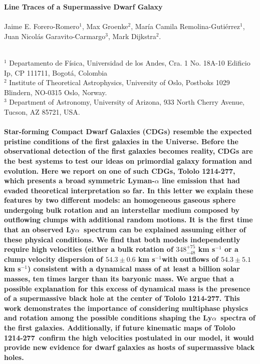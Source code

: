 \documentclass[a4paper, usenatbib, 12pt]{article}
\newcommand{\tol}{Tololo 1214-277}
\newcommand{\lya}{Ly$\alpha$}
\newcommand{\sigmaclump}{$54.3\pm 0.6$ km s$^{-1}$}
\newcommand{\inftyclump}{$54.3\pm 5.1$ km s$^{-1}$}
\begin{document}
\pagestyle{empty}
\noindent
\textbf{Line Traces of a Supermassive Dwarf Galaxy}
\\
\\
Jaime E. Forero-Romero$^{1}$, Max Groenke$^2$, Mar\'ia Camila
Remolina-Guti\'errez$^1$, Juan Nicol\'as
Garavito-Carmargo$^3$, Mark Dijkstra$^2$.
\\
\\
\scriptsize
{$^1$ Departamento de Física, Universidad de los Andes, Cra. 1
  No. 18A-10 Edificio Ip, CP 111711, Bogot\'a, Colombia 
\\
$^2$ Institute of Theoretical Astrophysics, University of Oslo,
Postboks 1029 Blindern, NO-0315 Oslo, Norway.
\\
$^3$ Department of Astronomy, University of Arizona, 933 North Cherry
Avenue, Tucson, AZ 85721, USA. 
\normalsize
\\
\\
\textbf{
  Star-forming Compact Dwarf Galaxies (CDGs) resemble the expected
  pristine conditions of the first galaxies in the Universe.    
Before the observational detection of the first galaxies becomes
reality, CDGs are the best systems to test our ideas on primordial
galaxy formation and evolution.    
Here we report on one of such CDGs, \tol, which presents
a broad symmetric Lyman-$\alpha$ line emission that had evaded theoretical
interpretation so far. 
In this letter we explain these features by two different models: an
homogeneous gaseous sphere undergoing bulk rotation and an interstellar
medium composed by outflowing clumps with additional random motions.
It is the first time that an observed \lya\ spectrum can be explained
assuming either of these physical conditions.
We find that both models independently require high velocities
(either a bulk rotation of $348^{+75}_{-48}$ km s$^{-1}$ or a clump velocity
dispersion of \sigmaclump with outflows of
\inftyclump) consistent with a dynamical mass of at
least a billion solar masses, ten times larger than its baryonic mass.   
We argue that a possible explanation for this excess of
dynamical mass is the presence of a supermassive black hole at the
center of \tol. 
This work demonstrates the importance of considering multiphase
physics and rotation among the possible conditions shaping the
\lya\ spectra of the first galaxies.  
Additionally, if future kinematic maps of \tol\ confirm the high
velocities postulated in our model, it would provide new
evidence for dwarf galaxies as hosts of supermassive black
holes.  
}  



}
\end{document}
